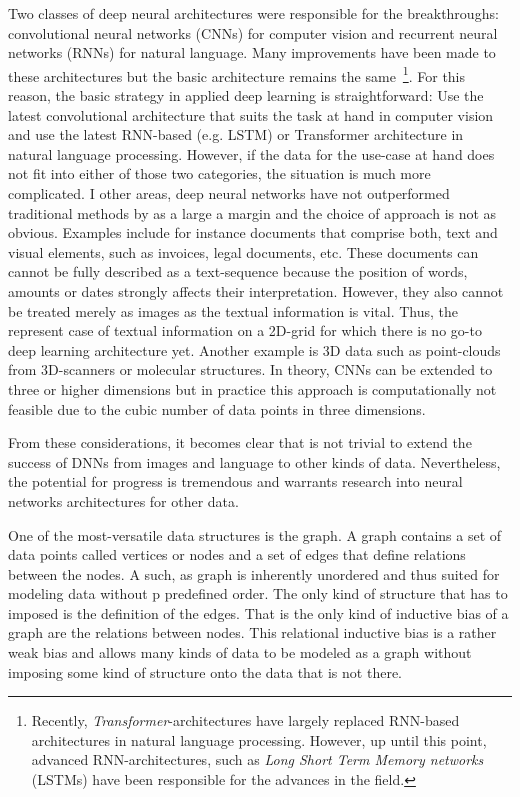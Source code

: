 Two classes of deep neural architectures were responsible for the breakthroughs: convolutional neural networks (CNNs) for computer vision and recurrent neural networks (RNNs) for natural language. Many improvements have been made to these architectures but the basic architecture remains the same~\footnote{Recently, \textit{Transformer}-architectures have largely replaced RNN-based architectures in natural language processing. However, up until this point, advanced RNN-architectures, such as \textit{Long Short Term Memory networks} (LSTMs) have been responsible for the advances in the field.}. For this reason, the basic strategy in applied deep learning is straightforward: Use the latest convolutional architecture that suits the task at hand in computer vision and use the latest RNN-based (e.g. LSTM) or Transformer architecture in natural language processing. However, if the data for the use-case at hand does not fit into either of those two categories, the situation is much more complicated. I other areas, deep neural networks have not outperformed traditional methods by as a large a margin and the choice of approach is not as obvious. Examples include for instance documents that comprise both, text and visual elements, such as invoices, legal documents, etc. These documents can cannot be fully described as a text-sequence because the position of words, amounts or dates strongly affects their interpretation. However, they also cannot be treated merely as images as the textual information is vital. Thus, the represent case of textual information on a 2D-grid for which there is no go-to deep learning architecture yet. Another example is 3D data such as point-clouds from 3D-scanners or molecular structures. In theory, CNNs can be extended to three or higher dimensions but in practice this approach is computationally not feasible due to the cubic number of data points in three dimensions.

From these considerations, it becomes clear that is not trivial to extend the success of DNNs from images and language to other kinds of data. Nevertheless, the potential for progress is tremendous and warrants research into neural networks architectures for other data.

One of the most-versatile data structures is the graph. A graph contains a set of data points called vertices or nodes and a set of edges that define relations between the nodes. A such, as graph is inherently unordered and thus suited for modeling data without p predefined order. The only kind of structure that has to imposed is the definition of the edges. That is the only kind of inductive bias of a graph are the relations between nodes. This relational inductive bias is a rather weak bias and allows many kinds of data to be modeled as a graph without imposing some kind of structure onto the data that is not there.



